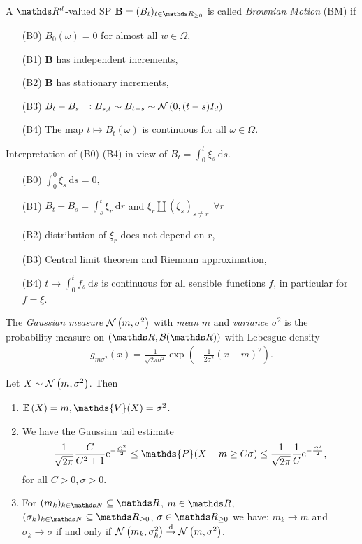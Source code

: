 \begin{defi}
A $\Rd$-valued SP $\textbf{B}=(B_t)_{t \in \R_{\geq 0}}$ is called \emph{Brownian Motion} (BM) if 
\begin{enumerate}
\item[(B0)] $B_0(\omega)=0$ for almost all $w\in \Omega$,
\item[(B1)] $\textbf{B}$ has independent increments,
\item[(B2)] $\textbf{B}$ has stationary increments,
\item[(B3)] $B_t-B_s\eqqcolon B_{s,t}\sim B_{t-s}\sim \mathcal{N}\left(0,(t-s)I_d\right)$
\item[(B4)] The map $t\mapsto B_t(\omega)$ is continuous for all $\omega \in \Omega$.
\end{enumerate}
\end{defi}

\begin{bem}
Interpretation of (B0)-(B4) in view of $B_t=\int_0^t \xi_s~\mathrm{d}s$.
\begin{enumerate}
\item[(B0)] $\int_0^0\xi_s~\mathrm{d}s=0$,
\item[(B1)] $B_t-B_s=\int_s^t \xi_r~\mathrm{d}r$ and $\xi_r \amalg (\xi_s)_{s\not =r}~~\forall r$
\item[(B2)] distribution of $\xi_r$ does not depend on $r$,
\item[(B3)] Central limit theorem and Riemann approximation,
\item[(B4)] $t\to \int_0^t f_s~\mathrm{d}s$ is continuous for all \glqq sensible\grqq\, functions $f$, in particular for $f=\xi$.
\end{enumerate}
\end{bem}

\begin{defi}
The \emph{Gaussian measure} $\mathcal{N}\left(m,\sigma^2\right)$ with \emph{mean} $m$ and \emph{variance} $\sigma^2$ is the probability measure on
$(\R,\mathcal{B}(\R))$ with Lebesgue density
\begin{align*}
g_{m\sigma^2}(x)=\frac{1}{\sqrt{2\pi \sigma^2}} \exp\left(-\frac{1}{2\sigma^2}(x-m)^2\right).
\end{align*}
\end{defi}

\begin{prop}
Let $X\sim \mathcal{N}\left(m,\sigma^2\right)$. Then
\begin{enumerate}[label=(\alph*)]
\item $\E{X}=m, \mathds{V}(X)=\sigma^2$.
\item We have the \glqq Gaussian tail estimate\grqq
\begin{align*}
\frac{1}{\sqrt{2\pi}} \frac{C}{C^2+1}\e^{-\frac{C^2}{2}}\leq \mathds{P}(X-m\geq C \sigma)\leq \frac{1}{\sqrt{2\pi}} \frac{1}{C}\e^{-\frac{C^2}{2}},
\end{align*}
for all $C>0,\sigma>0$.
\item For $(m_k)_{k\in \N}\subseteq \R$, $m\in \R$, $(\sigma_k)_{k\in \N}\subseteq \R_{\geq 0}$, $\sigma\in \R_{\geq 0}$ we have:
$m_k\to m$ and $\sigma_k\to \sigma$ if and only if $\mathcal{N}\left(m_k,\sigma_k^2\right)\overset{\text{d}}{\to} \mathcal{N}\left(m,\sigma^2\right)$.
\end{enumerate}
\end{prop}

